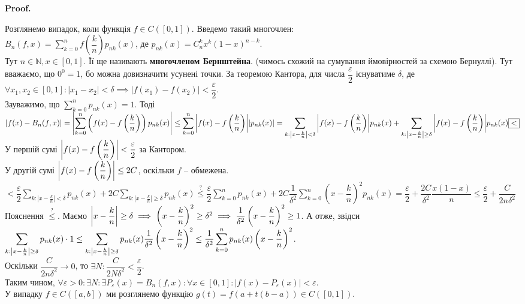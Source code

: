 \documentclass[a4paper, 10pt]{article}
\makeatletter
\def\qed{$\blacksquare$}
\theoremstyle{theoremdd}
\theoremstyle{theoremdd}
\theoremstyle{theoremdd}
\theoremstyle{theoremdd}
\theoremstyle{theoremdd}
\theoremstyle{theoremdd}
\theoremstyle{theoremdd}
\theoremstyle{theoremdd}
\theoremstyle{theoremdd}
\theoremstyle{theoremdd}
\theoremstyle{theoremdd}
\theoremstyle{theoremdd}
\theoremstyle{theoremdd}
\theoremstyle{theoremdd}
\theoremstyle{theoremdd}
\renewenvironment{proof}[1][Proof.\\]{\par
\pushQED{\hfill \qed}%
\normalfont \topsep6\p@\@plus6\p@\relax
\trivlist
\item\relax
{\bfseries
#1\@addpunct{.}}\hspace\labelsep\ignorespaces
}{%
\popQED\endtrivlist\@endpefalse
}
\makeatother
\begin{document}
\begin{proof}
Розглянемо випадок, коли функція $f \in C([0,1])$. Введемо такий многочлен:\\
$B_n(f,x) = \displaystyle\sum_{k=0}^n f \left( \dfrac{k}{n} \right) p_{nk}(x)$, де $p_{nk}(x) = C_n^k x^k (1-x)^{n-k}$.\\
Тут $n \in \mathbb{N}, x \in [0,1]$. Її ще називають \textbf{многочленом Бернштейна}. (чимось схожий на сумування ймовірностей за схемою Бернуллі). Тут вважаємо, що $0^0 = 1$, бо можна довизначити усунені точки. За теоремою Кантора, для числа $\dfrac{\varepsilon}{2}$ існуватиме $\delta$, де $\forall x_1,x_2 \in [0,1]: |x_1-x_2| < \delta \implies |f(x_1)-f(x_2)| < \dfrac{\varepsilon}{2}$.\\
Зауважимо, що $\displaystyle\sum_{k=0}^n p_{nk}(x) = 1$.
Тоді\\
$|f(x) - B_{n}(f,x)| = \displaystyle\abs{\sum_{k=0}^n \left( f(x) - f\left( \dfrac{k}{n} \right) \right) p_{nk}(x) } \leq \sum_{k=0}^n \abs{f(x) - f\left( \dfrac{k}{n} \right)} |p_{nk}(x)| \\
= \sum_{k: \left| x -\frac{k}{n} \right| < \delta} \abs{f(x) - f\left( \dfrac{k}{n} \right)} p_{nk}(x) + \sum_{k: \left| x -\frac{k}{n} \right| \geq \delta} \abs{f(x) - f\left( \dfrac{k}{n} \right)} p_{nk}(x) \boxed{<}$\\
У першій сумі $\abs{f(x) - f\left( \dfrac{k}{n} \right)} < \dfrac{\varepsilon}{2}$ за Кантором.\\
У другій сумі $\abs{f(x) - f\left( \dfrac{k}{n} \right)} \leq 2C$, оскільки $f$ -- обмежена.\\
$\boxed{<} \displaystyle \dfrac{\varepsilon}{2} \sum_{k: \left| x -\frac{k}{n} \right| < \delta} p_{nk}(x) + 2C \sum_{k: \left| x -\frac{k}{n} \right| \geq \delta} p_{nk}(x) \overset{?}{\leq} \dfrac{\varepsilon}{2} \sum_{k=0}^n p_{nk}(x) + 2C \dfrac{1}{\delta^2} \sum_{k=0}^n \left( x -\dfrac{k}{n} \right)^2 p_{nk}(x) = \dfrac{\varepsilon}{2} + \dfrac{2C}{\delta^2} \dfrac{x(1-x)}{n} \leq \dfrac{\varepsilon}{2} + \dfrac{C}{2n\delta^2}$\\
Пояснення $\overset{?}{\leq}$. Маємо $\abs{x - \dfrac{k}{n}} \geq \delta \implies \left( x - \dfrac{k}{n} \right)^2 \geq \delta^2 \implies \dfrac{1}{\delta^2} \left( x - \dfrac{k}{n} \right)^2 \geq 1$. А отже, звідси\\
$\displaystyle\sum_{k: \abs{x - \frac{k}{n}} \geq \delta} p_{nk}(x) \cdot 1 \leq \sum_{k: \abs{x - \frac{k}{n}} \geq \delta} p_{nk}(x) \dfrac{1}{\delta^2} \left( x - \dfrac{k}{n} \right)^2 \leq \dfrac{1}{\delta^2} \sum_{k=0}^n p_{nk}(x) \left( x - \dfrac{k}{n} \right)^2$.\\
Оскільки $\dfrac{C}{2n\delta^2} \to 0$, то $\exists N: \dfrac{C}{2N\delta^2} < \dfrac{\varepsilon}{2}$.\\
Таким чином, $\forall \varepsilon > 0: \exists N: \exists P_\varepsilon(x) = B_n(f,x): \forall x \in [0,1]: |f(x)- P_{\varepsilon}(x)| < \varepsilon$.
\bigskip \\
У випадку $f \in C([a,b])$ ми розглянемо функцію $g(t) = f(a+t(b-a)) \in C([0,1])$.
\end{proof}
\end{document}
